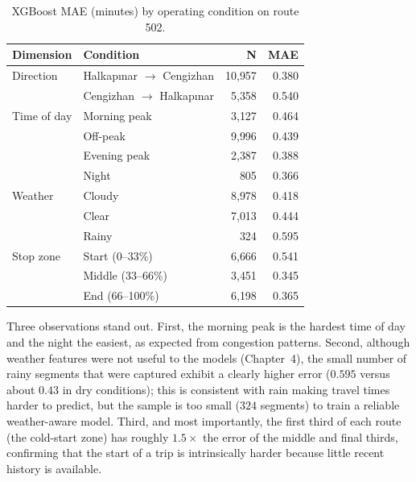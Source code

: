\begin{table}[!htbp]
    \centering
    \caption{\label{tab:condition}XGBoost MAE (minutes) by operating condition on route 502.}
    \begin{tabular}{@{}llrr@{}}
        \toprule
        \textbf{Dimension} & \textbf{Condition} & \textbf{N} & \textbf{MAE} \\
        \midrule
        Direction    & Halkapınar $\rightarrow$ Cengizhan & 10{,}957 & 0.380 \\
                     & Cengizhan $\rightarrow$ Halkapınar & 5{,}358  & 0.540 \\
        \midrule
        Time of day  & Morning peak  & 3{,}127 & 0.464 \\
                     & Off-peak      & 9{,}996 & 0.439 \\
                     & Evening peak  & 2{,}387 & 0.388 \\
                     & Night         & 805     & 0.366 \\
        \midrule
        Weather      & Cloudy        & 8{,}978 & 0.418 \\
                     & Clear         & 7{,}013 & 0.444 \\
                     & Rainy         & 324     & 0.595 \\
        \midrule
        Stop zone    & Start (0--33\%)   & 6{,}666 & 0.541 \\
                     & Middle (33--66\%) & 3{,}451 & 0.345 \\
                     & End (66--100\%)   & 6{,}198 & 0.365 \\
        \bottomrule
    \end{tabular}
\end{table}

Three observations stand out. First, the morning peak is the hardest time of day and the night the easiest, as expected from congestion patterns. Second, although weather features were not useful to the models (Chapter~4), the small number of rainy segments that were captured exhibit a clearly higher error ($0.595$ versus about $0.43$ in dry conditions); this is consistent with rain making travel times harder to predict, but the sample is too small ($324$ segments) to train a reliable weather-aware model. Third, and most importantly, the first third of each route (the cold-start zone) has roughly $1.5\times$ the error of the middle and final thirds, confirming that the start of a trip is intrinsically harder because little recent history is available.

